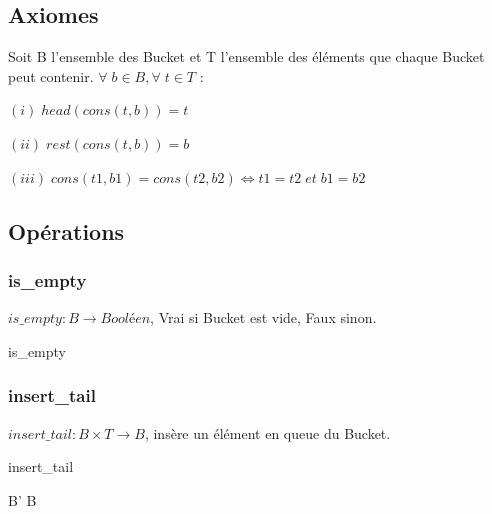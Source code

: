 \documentclass{article}
\begin{document}
\subsection{Axiomes}

Soit B l'ensemble des Bucket et T l'ensemble des éléments que chaque Bucket peut contenir.
\newline
\newline
$\forall \; b \in B, \forall \; t \in T$ :
\newline

$(i)\; head (cons (t, b)) = t$
\newline

$(ii)\;  rest (cons (t, b)) = b$
\newline

$(iii) \; cons (t1, b1) = cons (t2, b2) \iff t1 = t2 \; et \; b1 = b2$

\newpage
\subsection{Opérations}


\subsubsection{is\_empty}
$is\_empty : B \longrightarrow Booléen$, Vrai si Bucket est vide, Faux sinon.
\newline

\begin{algorithm}[H]
\caption{is\_empty}\label{alg:two}
\end{algorithm}


\subsubsection{insert\_tail} 
$insert\_tail : B \times T \longrightarrow B$, insère un élément en queue du Bucket.
\newline

\begin{algorithm}[H]
\caption{insert\_tail}\label{alg:two}
B' \gets B\\

\end{algorithm}
\end{document}
